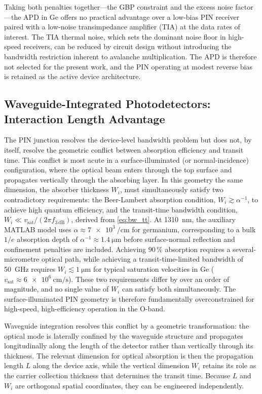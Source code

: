 Taking both penalties together---the GBP constraint and the excess noise
factor---the APD in Ge offers no practical advantage over a low-bias PIN
receiver paired with a low-noise transimpedance amplifier (TIA) at the
data rates of interest. The TIA thermal noise, which sets the dominant
noise floor in high-speed receivers, can be reduced by circuit design
without introducing the bandwidth restriction inherent to avalanche
multiplication. The APD is therefore not selected for the present work,
and the PIN operating at modest reverse bias is retained as the active
device architecture.

\subsection[Waveguide-Integrated Photodetectors]{Waveguide-Integrated Photodetectors: Interaction Length Advantage}
\label{subsec:pd_waveguide}

The PIN junction resolves the device-level bandwidth problem but does not, by
itself, resolve the geometric conflict between absorption efficiency and transit
time. This conflict is most acute in a surface-illuminated (or
normal-incidence) configuration, where the optical beam enters through the top
surface and propagates vertically through the absorbing layer. In this geometry
the same dimension, the absorber thickness $W_i$, must simultaneously satisfy
two contradictory requirements: the Beer-Lambert absorption condition,
$W_i \gtrsim \alpha^{-1}$, to achieve high quantum efficiency, and the transit-time
bandwidth condition, $W_i \ll v_{\mathrm{sat}}/(2\pi f_{3\,\mathrm{dB}})$,
derived from \cref{eq:bw_tt}. At \SI{1310}{\nano\metre}, the auxiliary MATLAB
model uses $\alpha\approx\SI{7e3}{\per\centi\metre}$ for germanium, corresponding
to a bulk $1/e$ absorption depth of $\alpha^{-1}\approx\SI{1.4}{\micro\metre}$
before surface-normal reflection and confinement penalties are included.
Achieving 90\,\% absorption requires a several-micrometre optical path, while
achieving a transit-time-limited bandwidth of \SI{50}{\giga\hertz} requires
$W_i \lesssim \SI{1}{\micro\metre}$ for typical saturation velocities in Ge
($v_{\mathrm{sat}}\approx\SI{6e6}{\centi\metre\per\second}$). These two
requirements differ by over an order of magnitude, and no single value of
$W_i$ can satisfy both simultaneously. The surface-illuminated PIN geometry
is therefore fundamentally overconstrained for high-speed, high-efficiency
operation in the O-band.

Waveguide integration resolves this conflict by a geometric transformation:
the optical mode is laterally confined by the waveguide structure and
propagates longitudinally along the length of the detector rather than
vertically through its thickness. The relevant dimension for optical absorption
is then the propagation length $L$ along the device axis, while the vertical
dimension $W_i$ retains its role as the carrier collection thickness that
determines the transit time. Because $L$ and $W_i$ are orthogonal spatial
coordinates, they can be engineered independently.

